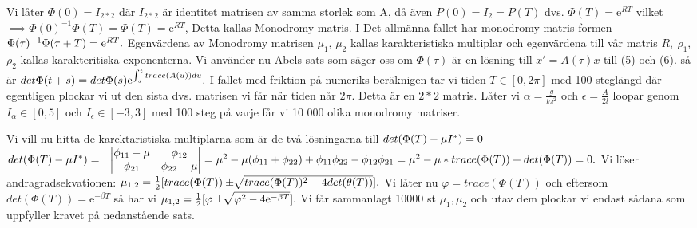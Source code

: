 \documentclass{article}
\begin{document}
Vi låter ${\Phi}(0) = I_{2*2}$ där $I_{2*2}$ är identitet matrisen av samma storlek som A, då även $P(0) = I_2 = P(T)$ dvs. ${\Phi}(T) = \mathrm{e} ^{RT}$ vilket $ \implies {\Phi}(0)^{-1} {\Phi}(T) = {\Phi}(T) = \mathrm{e}^{RT} $, Detta kallas Monodromy matris. I Det allmänna fallet har monodromy matris formen 
${\Phi}({\tau})^{-1} {\Phi}({\tau}+T) = \mathrm{e}^{RT}. \newline $
Egenvärdena av Monodromy matrisen ${\mu}_1$, ${\mu}_2$ kallas karakteristiska multiplar och egenvärdena till vår matris $R,\ {\rho}_1$, ${\rho}_2$ kallas karakteritiska exponenterna. Vi använder nu Abels sats som säger oss om ${\Phi}({\tau})$ är en lösning till $\bar{x'} = A({\tau}) \bar{x} $ till (5) och (6). så är 
$ \newline det{\Phi}(t + s) = det{\Phi}(s)\mathrm{e}^{\int_s^t trace(A(u))du}.\newline$ 
I fallet med friktion på numeriks beräknigen tar vi tiden $T \in [0, 2{\pi}]$ med 100 steglängd där egentligen plockar vi ut den sista dvs. matrisen vi får när tiden når $2{\pi}$. Detta är en $2*2$ matris. \newline
Låter vi ${\alpha} = \frac{g}{l{\omega}^{2}}$ och ${\epsilon} = \frac{A}{2l}$ loopar genom $I_{\alpha} \in [0, 5]$ och $I_{\epsilon} \in [-3, 3]$ med 100 steg på varje får vi 10 000 olika monodromy matriser.\newline

Vi vill nu hitta de karektaristiska multiplarna som är de
två lösningarna till $\newline det({\Phi}(T)-{\mu}I^{*})=0 \newline $
$\newline det({\Phi}(T)-{\mu}I^{*})= \ \ 
\begin{vmatrix}
{\phi}_{11} - {\mu} &  {\phi}_{12} \\ {\phi}_{21} & {\phi}_{22} - {\mu}
\end{vmatrix} = {\mu}^{2} - {\mu}({\phi}_{11} + {\phi}_{22}) + {\phi}_{11}{\phi}_{22} - {\phi}_{12}{\phi}_{21} = {\mu}^{2} - {\mu}* trace({\Phi}(T)) + det({\Phi}(T)) = 0. \newline \newline$
Vi löser andragradsekvationen:  \newline
$ {\mu}_{1,2} = \frac{1}{2}[trace({\Phi}(T)) \pm \sqrt[]{trace({\Phi}(T))^{2} - 4det({\theta}(T))}].\newline$
Vi låter nu ${\varphi} = trace({\Phi}(T))$ och eftersom $det({\Phi}(T)) = \mathrm{e}^{-{\beta}T}$ så har vi 
$ \newline {\mu}_{1,2} = \frac{1}{2}[{\varphi} \pm \sqrt[]{{\varphi}^{2} - 4 \mathrm{e}^{-{\beta}T}}].\newline$
Vi får sammanlagt 10000 st ${\mu}_1, {\mu}_2$ och utav dem plockar vi endast sådana som uppfyller kravet på nedanstående sats. 
\end{document}
